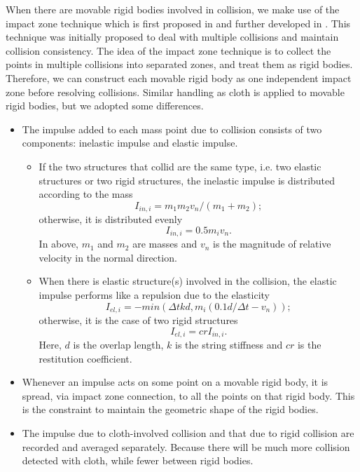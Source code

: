 When there are movable rigid bodies involved in collision, we make use of the
impact zone technique which is first proposed in \cite{Provot1997} and further
developed in \cite{Bridson2002collsn}.
This technique was initially proposed to deal with multiple collisions and
maintain collision consistency.
The idea of the impact zone technique is to collect the points in multiple
collisions into separated zones, and treat them as rigid bodies.
Therefore, we can construct each movable rigid body as one independent impact
zone before resolving collisions.
Similar handling as cloth is applied to movable rigid bodies, but we adopted
some differences.
\begin{itemize}
\item The impulse added to each mass point due to collision consists of two
components: inelastic impulse and elastic impulse.
    \begin{itemize}
    \item If the two structures that collid are the same type, i.e. two
    elastic structures or two rigid structures, the inelastic impulse is
    distributed according to the mass
    \begin{equation}
    I_{in, i} = m_{1}m_{2}v_{n} / (m_1 + m_2); 
    \end{equation}
    otherwise, it is distributed evenly
    \begin{equation}
    I_{in,i} = 0.5 m_{i}v_{n}. 
    \end{equation}
    In above, $m_{1}$ and $m_{2}$ are masses and $v_{n}$ is the magnitude of
    relative velocity in the normal direction.
    \item When there is elastic structure(s) involved in the collision,
    the elastic impulse performs like a repulsion due to the elasticity
    \begin{equation}
    I_{el, i} = -min(\Delta t k d, m_{i}(0.1d/\Delta t - v_{n})); 
    \end{equation}
    otherwise, it is the case of two rigid structures
    \begin{equation}
    I_{el, i} = cr I_{in, i}. 
    \end{equation}
    Here, $d$ is the overlap length, $k$ is the string stiffness and $cr$ is
    the restitution coefficient.
    \end{itemize}
\item Whenever an impulse acts on some point on a movable rigid body, it is
spread, via impact zone connection, to all the points on that rigid body.
This is the constraint to maintain the geometric shape of the rigid bodies.
\item The impulse due to cloth-involved collision and that due to rigid
collision are recorded and averaged separately.
Because there will be much more collision detected with cloth, while fewer
between rigid bodies.
\end{itemize}



\newpage
